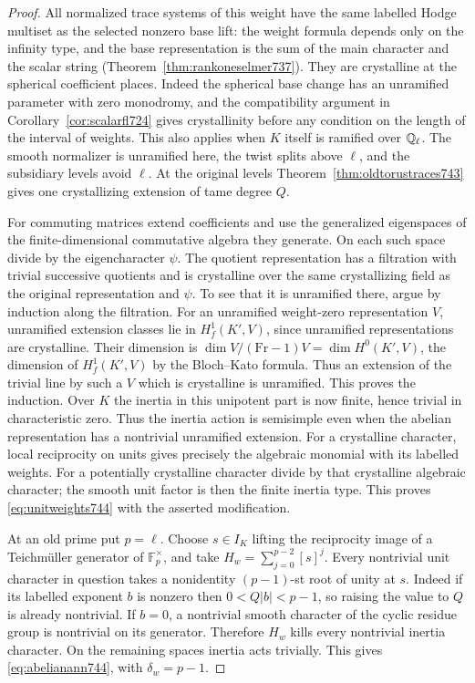 \documentclass[a4paper,11pt]{article}
\theoremstyle{definition}
\theoremstyle{remark}
\numberwithin{equation}{section}
\begin{document}
\begin{proof}
All normalized trace systems of this weight have the same
labelled Hodge multiset as the selected nonzero base lift:
the weight formula depends only on the infinity type, and the
base representation is the sum of the main character and the
scalar string (Theorem~\ref{thm:rankoneselmer737}). They are
crystalline at the spherical coefficient places. Indeed the
spherical base change has an unramified parameter with zero
monodromy, and the compatibility argument in
Corollary~\ref{cor:scalarfl724} gives crystallinity before any
condition on the length of the interval of weights. This also
applies when \(K\) itself is ramified over \(\mathbb Q_\ell\).
The smooth normalizer is unramified here, the twist splits above
\(\ell\), and the subsidiary levels avoid \(\ell\). At the
original levels Theorem~\ref{thm:oldtorustraces743} gives one
crystallizing extension of tame degree \(Q\).

For commuting matrices extend coefficients and use the generalized
eigenspaces of the finite-dimensional commutative algebra they
generate. On each such space divide by the eigencharacter
\(\psi\). The quotient representation has a filtration with
trivial successive quotients and is crystalline over the same
crystallizing field as the original representation and \(\psi\).
To see that it is unramified there, argue by induction along the
filtration. For an unramified weight-zero representation \(V\),
unramified extension classes lie in \(H^1_f(K',V)\), since
unramified representations are crystalline. Their dimension is
\(\dim V/(\mathrm{Fr}-1)V=\dim H^0(K',V)\), the dimension
of \(H^1_f(K',V)\) by the Bloch--Kato formula. Thus an extension
of the trivial line by such a \(V\) which is crystalline is
unramified. This proves the induction. Over \(K\) the inertia
in this unipotent part is now finite, hence trivial in
characteristic zero. Thus the inertia action is semisimple even
when the abelian representation has a nontrivial unramified
extension. For a crystalline character, local reciprocity on
units gives precisely the algebraic monomial with its labelled
weights. For a potentially crystalline character divide by
that crystalline algebraic character; the smooth unit factor
is then the finite inertia type. This proves
\eqref{eq:unitweights744} with the asserted modification.
~\cite[Appendix~B, Proposition~B.4]{X-VII-conradunits744}

At an old prime put \(p=\ell\). Choose \(s\in I_K\) lifting
the reciprocity image of a Teichm\"uller generator of
\(\mathbb F_p^\times\), and take \(H_w=\sum_{j=0}^{p-2}[s]^j\).
Every nontrivial unit character in question takes a nonidentity
\((p-1)\)-st root of unity at \(s\). Indeed if its labelled
exponent \(b\) is nonzero then \(0<Q|b|<p-1\), so raising the
value to \(Q\) is already nontrivial. If \(b=0\), a nontrivial
smooth character of the cyclic residue group is nontrivial on
its generator. Therefore \(H_w\) kills every nontrivial inertia
character. On the remaining spaces inertia acts trivially.
This gives \eqref{eq:abelianann744}, with \(\delta_w=p-1\).


\end{proof}
\end{document}
